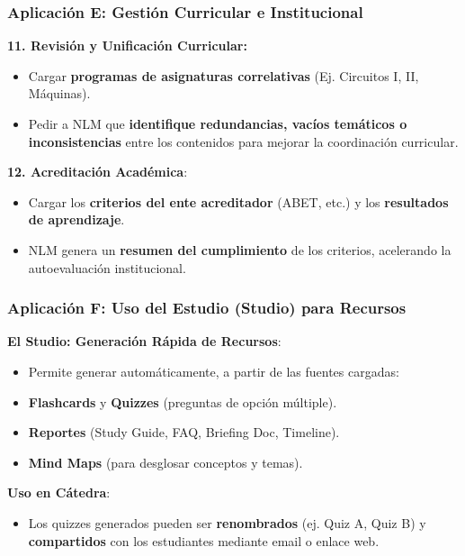 \documentclass[aspectratio=43]{beamer}
\begin{document}
\begin{frame}
\frametitle{ Aplicación E: Gestión Curricular e Institucional}

\textbf{11. Revisión y Unificación Curricular:} 
\begin{itemize}
    \item Cargar \textbf{programas de asignaturas correlativas} (Ej. Circuitos I, II, Máquinas).
    \item Pedir a NLM que \textbf{identifique redundancias, vacíos temáticos o inconsistencias} entre los contenidos para mejorar la coordinación curricular.
\end{itemize}

\vfill
\textbf{12. Acreditación Académica}:
\begin{itemize}
    \item Cargar los \textbf{criterios del ente acreditador} (ABET, etc.) y los \textbf{resultados de aprendizaje}.
    \item NLM genera un \textbf{resumen del cumplimiento} de los criterios, acelerando la autoevaluación institucional.
\end{itemize}
\end{frame}

\begin{frame}
\frametitle{ Aplicación F: Uso del Estudio (Studio) para Recursos}

\textbf{El Studio: Generación Rápida de Recursos}:
\begin{itemize}
    \item Permite generar automáticamente, a partir de las fuentes cargadas:
    \item \textbf{Flashcards} y \textbf{Quizzes} (preguntas de opción múltiple).
    \item \textbf{Reportes} (Study Guide, FAQ, Briefing Doc, Timeline).
    \item \textbf{Mind Maps} (para desglosar conceptos y temas).
\end{itemize}

\vfill
\textbf{Uso en Cátedra}:
\begin{itemize}
    \item Los quizzes generados pueden ser \textbf{renombrados} (ej. Quiz A, Quiz B) y \textbf{compartidos} con los estudiantes mediante email o enlace web.
\end{itemize}
\end{frame}

\end{document}
